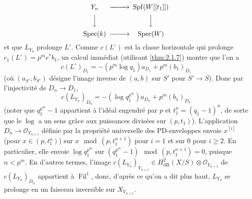\documentclass[12pt,a4paper]{article}
\theoremstyle{plain}
\theoremstyle{definition}
\theoremstyle{remark}
\DeclareMathOperator{\Fil}{Fil}
\DeclareMathOperator{\Spec}{Spec}
\DeclareMathOperator{\Spf}{Spf}
\providecommand{\Spec}{\operatorname{Spec}}
\begin{document}
\[
\begin{CD}
Y_n @>>> \Spf(W[[t_1]]) \\
@VVV @VVV \\
\Spec(k) @>>> \Spec(W)
\end{CD}
\]
et que $L_{Y_n}$ prolonge $L^\circ$. Comme $c(L^\circ)$ est la classe horizontale qui prolonge $c_1(L^\circ) = p^m e^* b_1$, un calcul imm\'ediat (utilisant \ref{thm:2.1.7}) montre que l'on a
\[
c(L^\circ)_{D_1} = -(p^m \log q_1)a_{D_1} + p^m (b_1)_{D_1}
\]
(o\`u $(a_{S'}, b_{S'})$ d\'esigne l'image inverse de $(a, b)$ sur $S'$ pour $S' \to S$). Donc par l'injectivit\'e de $D_n \to D_1$,
\[
c(L_{Y_n})_{D_n} = -(\log q_1^{p^m})a_{D_n} + p^m (b_1)_{D_n}
\]
(noter que $q_1^{p^m} - 1$ appartient \`a l'id\'eal engendr\'e par $p$ et $t_1^n = (q_1 - 1)^n$, de sorte que le $\log$ a un sens gr\^ace aux puissances divis\'ees sur $(p, t_1)$). L'application $D_n \to \mathcal{O}_{Y_{n+1}}$ d\'efinie par la propri\'et\'e universelle des PD-enveloppes envoie $x^{[i]}$ (pour $x \in (p, t_1^n)$) sur $x \mod (p, t_1^{n+1})$ pour $i = 1$ et sur $0$ pour $i \geqslant 2$. En particulier, elle envoie $\log q_1^{p^m}$ sur $(q_1^{p^m} - 1) \mod (p, t_1^{n+1}) = 0$, puisque $n < p^m$. En d'autres termes, l'image $c(L_{Y_n})_{Y_{n+1}} \in H^2_\mathrm{dR}(X/S) \otimes \mathcal{O}_{Y_{n+1}}$ de $c(L_{Y_n})_{D_n}$ appartient \`a $\Fil^1$, donc, d'apr\`es ce qu'on a dit plus haut, $L_{Y_n}$ se prolonge en un faisceau inversible sur $X_{Y_{n+1}}$.
\end{document}
